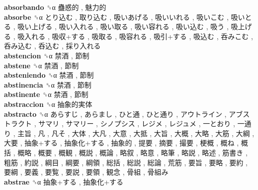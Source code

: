 \textbf{absorbando} ␝α   蠱惑的 ,  魅力的   \\
\textbf{absorbe} ␝α   とり込む ,  取り込む ,  吸いあげる ,  吸いいれる ,  吸いこむ ,  吸いとる ,  吸い上げる ,  吸い入れる ,  吸い取る ,  吸い容れる ,  吸い込む ,  吸う ,  吸上げる ,  吸入れる ,  吸収+する ,  吸取る ,  吸容れる ,  吸引+する ,  吸込む ,  呑みこむ ,  呑み込む ,  呑込む ,  採り入れる   \\
\textbf{abstencion} ␝α   禁酒 ,  節制   \\
\textbf{abstene} ␝α   禁酒 ,  節制   \\
\textbf{absteniendo} ␝α   禁酒 ,  節制   \\
\textbf{abstinencia} ␝α   禁酒 ,  節制   \\
\textbf{abstinente} ␝α   禁酒 ,  節制   \\
\textbf{abstraccion} ␝α   抽象的実体   \\
\textbf{abstracto} ␝α   あらすじ ,  あらまし ,  ひと通 ,  ひと通り ,  アウトライン ,  アブストラクト ,  サマリ ,  サマリー ,  シノプシス ,  レジメ ,  レジュメ ,  一とおり ,  一通り ,  主旨 ,  凡 ,  凡そ ,  大体 ,  大凡 ,  大意 ,  大抵 ,  大旨 ,  大概 ,  大略 ,  大筋 ,  大綱 ,  大要 ,  抽象+する ,  抽象化+する ,  抽象的 ,  提要 ,  摘要 ,  撮要 ,  梗概 ,  概ね ,  概括 ,  概略 ,  概要 ,  概観 ,  概説 ,  概論 ,  略叙 ,  略意 ,  略筆 ,  略説 ,  略述 ,  筋書き ,  粗筋 ,  約説 ,  綱目 ,  綱要 ,  綱領 ,  総括 ,  総説 ,  総論 ,  荒筋 ,  要旨 ,  要略 ,  要約 ,  要綱 ,  要義 ,  要覧 ,  要説 ,  要領 ,  観念 ,  骨組 ,  骨組み   \\
\textbf{abstrae} ␝α   抽象+する ,  抽象化+する   \\
